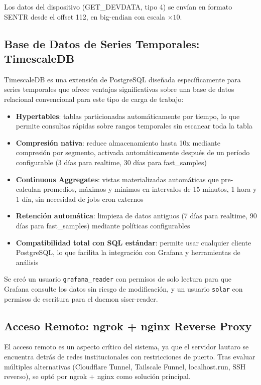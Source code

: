 \documentclass[12pt,a4paper]{article}
\begin{document}
Los datos del dispositivo (GET\_DEVDATA, tipo 4) se env\'ian en formato SENTR desde el offset 112, en big-endian con escala $\times 10$.

\subsection{Base de Datos de Series Temporales: TimescaleDB}

TimescaleDB es una extensi\'on de PostgreSQL dise\~nada espec\'ificamente para series temporales que ofrece ventajas significativas sobre una base de datos relacional convencional para este tipo de carga de trabajo:

\begin{itemize}
    \item \textbf{Hypertables}: tablas particionadas autom\'aticamente por tiempo, lo que permite consultas r\'apidas sobre rangos temporales sin escanear toda la tabla
    \item \textbf{Compresi\'on nativa}: reduce almacenamiento hasta 10x mediante compresi\'on por segmento, activada autom\'aticamente despu\'es de un per\'iodo configurable (3 d\'ias para realtime, 30 d\'ias para fast\_samples)
    \item \textbf{Continuous Aggregates}: vistas materializadas autom\'aticas que pre-calculan promedios, m\'aximos y m\'inimos en intervalos de 15 minutos, 1 hora y 1 d\'ia, sin necesidad de jobs cron externos
    \item \textbf{Retenci\'on autom\'atica}: limpieza de datos antiguos (7 d\'ias para realtime, 90 d\'ias para fast\_samples) mediante pol\'iticas configurables
    \item \textbf{Compatibilidad total con SQL est\'andar}: permite usar cualquier cliente PostgreSQL, lo que facilita la integraci\'on con Grafana y herramientas de an\'alisis
\end{itemize}

Se cre\'o un usuario \texttt{grafana\_reader} con permisos de solo lectura para que Grafana consulte los datos sin riesgo de modificaci\'on, y un usuario \texttt{solar} con permisos de escritura para el daemon siser-reader.

\subsection{Acceso Remoto: ngrok + nginx Reverse Proxy}

El acceso remoto es un aspecto cr\'itico del sistema, ya que el servidor lautaro se encuentra detr\'as de redes institucionales con restricciones de puerto. Tras evaluar m\'ultiples alternativas (Cloudflare Tunnel, Tailscale Funnel, localhost.run, SSH reverso), se opt\'o por ngrok + nginx como soluci\'on principal.
\end{document}
